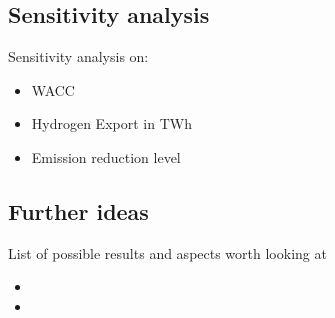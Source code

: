 \subsection{Sensitivity analysis}
Sensitivity analysis on:
\begin{itemize}
    \item WACC
    \item Hydrogen Export in TWh
    \item Emission reduction level
\end{itemize}


\subsection{Further ideas}
List of possible results and aspects worth looking at
\begin{itemize}
    \item 
    \item 
\end{itemize}